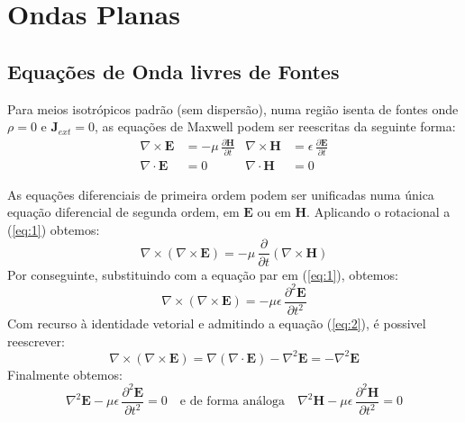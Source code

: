 \section{Ondas Planas}
\label{sec:ondas-planas}

\subsection{Equações de Onda livres de Fontes}
\label{sec:eq-onda-sem-fonte}

Para meios isotrópicos padrão (sem dispersão), numa região isenta de fontes onde  $\rho = 0$ e $\mathbf{J}_{ext} = 0$, as equações de Maxwell podem ser reescritas da seguinte forma:
\begin{align}
    \nabla\times \mathbf{E} &= -\mu\,\frac{\partial \mathbf{H}}{\partial t} & \nabla\times \mathbf{H} &= \epsilon\,\frac{\partial \mathbf{E}}{\partial t}\label{eq:1} \\
    \nabla\cdot \mathbf{E} &= 0 & \nabla\cdot \mathbf{H} &= 0\label{eq:2}
\end{align}

As equações diferenciais de primeira ordem podem ser unificadas numa única equação diferencial de segunda ordem, em $\mathbf{E}$ ou em $\mathbf{H}$. Aplicando o rotacional a (\ref{eq:1}) obtemos:
\begin{equation}
        \nabla \times (\nabla \times \mathbf{E}) = -\mu\,\dfrac{\partial}{\partial t}\left(\nabla \times \mathbf{H}\right)
\end{equation}
Por conseguinte, substituindo com a equação par em (\ref{eq:1}), obtemos:
\begin{equation}
    \nabla\times (\nabla \times \mathbf{E}) = -\mu\epsilon\,\frac{\partial^2 \mathbf{E}}{\partial t^2}
\end{equation}
Com recurso à identidade vetorial e admitindo a equação (\ref{eq:2}), é possivel reescrever:
\begin{equation}
     \nabla \times (\nabla \times \mathbf{E}) = \nabla(\nabla\cdot\mathbf{E}) - \nabla^2\mathbf{E} = - \nabla^2\mathbf{E}
\end{equation}
Finalmente obtemos:
\begin{equation} \label{eq:wave-eq}
    \boxed{\nabla^2\mathbf{E} -\mu\epsilon\,\frac{\partial^2 \mathbf{E}}{\partial t^2} = 0}
    \quad\text{e de forma análoga}\quad
    \boxed{\nabla^2\mathbf{H} -\mu\epsilon\,\frac{\partial^2 \mathbf{H}}{\partial t^2} = 0}
\end{equation}

